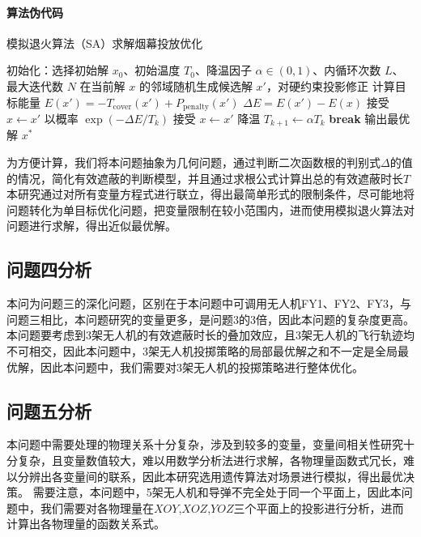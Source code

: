 \documentclass{article}
\begin{document}
\paragraph{算法伪代码}
\begin{algorithm}[H]
\caption{模拟退火算法（SA）求解烟幕投放优化}
\begin{algorithmic}[1]
\State 初始化：选择初始解 $x_0$、初始温度 $T_0$、降温因子 $\alpha\in(0,1)$、内循环次数 $L$、最大迭代数 $N$
    \State 在当前解 $x$ 的邻域随机生成候选解 $x'$，对硬约束投影修正
    \State 计算目标能量 $E(x')=-T_{\mathrm{cover}}(x')+P_{\mathrm{penalty}}(x')$
    \State $\Delta E=E(x')-E(x)$
     接受 $x\leftarrow x'$
    \Else \State 以概率 $\exp(-\Delta E/T_k)$ 接受 $x\leftarrow x'$
    \EndIf
  \EndFor
  \State 降温 $T_{k+1}\leftarrow \alpha T_k$
   \textbf{break}
  \EndIf
\EndFor
\State 输出最优解 $x^*$
\end{algorithmic}
\end{algorithm}


为方便计算，我们将本问题抽象为几何问题，通过判断二次函数根的判别式$\Delta$的值的情况，简化有效遮蔽的判断模型，并且通过求根公式计算出总的有效遮蔽时长$T$
本研究通过对所有变量方程式进行联立，得出最简单形式的限制条件，尽可能地将问题转化为单目标优化问题，把变量限制在较小范围内，进而使用模拟退火算法对问题进行求解，得出近似最优解。

\subsection{问题四分析}
本问为问题三的深化问题，区别在于本问题中可调用无人机FY1、FY2、FY3，与问题三相比，本问题研究的变量更多，是问题3的3倍，因此本问题的复杂度更高。
本问题要考虑到3架无人机的有效遮蔽时长的叠加效应，且3架无人机的飞行轨迹均不可相交，因此本问题中，3架无人机投掷策略的局部最优解之和不一定是全局最优解，因此本问题中，我们需要对3架无人机的投掷策略进行整体优化。

\subsection{问题五分析}
本问题中需要处理的物理关系十分复杂，涉及到较多的变量，变量间相关性研究十分复杂，且变量数值较大，难以用数学分析法进行求解，各物理量函数式冗长，难以分辨出各变量间的联系，因此本研究选用遗传算法对场景进行模拟，得出最优决策。
需要注意，本问题中，5架无人机和导弹不完全处于同一个平面上，因此本问题中，我们需要对各物理量在$XOY$,$XOZ$,$YOZ$三个平面上的投影进行分析，进而计算出各物理量的函数关系式。
\end{document}
